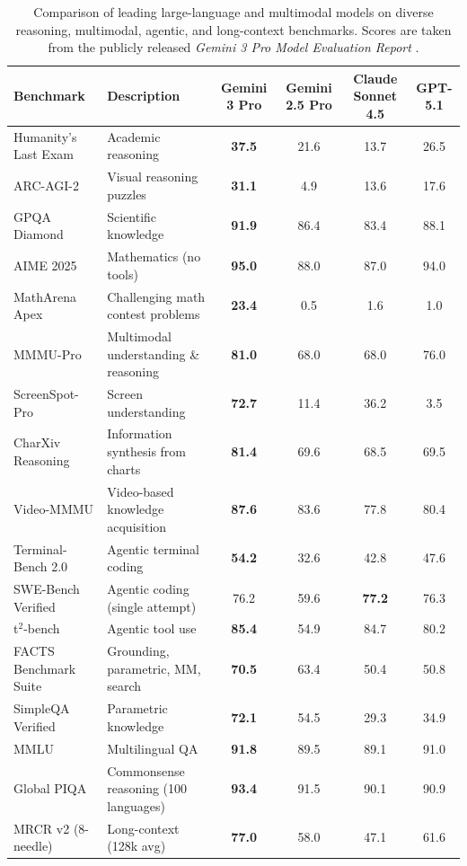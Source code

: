 \documentclass{article}
\begin{document}
\begin{table}[t]
\centering
\scriptsize
\begin{tabularx}{\textwidth}{l X c c c c}
\toprule
\textbf{Benchmark} & \textbf{Description} & \textbf{Gemini 3 Pro} & \textbf{Gemini 2.5 Pro} & \textbf{Claude Sonnet 4.5} & \textbf{GPT-5.1} \\
\midrule
Humanity’s Last Exam & Academic reasoning & \textbf{37.5} & 21.6 & 13.7 & 26.5 \\
ARC-AGI-2 & Visual reasoning puzzles & \textbf{31.1} & 4.9 & 13.6 & 17.6 \\
GPQA Diamond & Scientific knowledge & \textbf{91.9} & 86.4 & 83.4 & 88.1 \\
AIME 2025 & Mathematics (no tools) & \textbf{95.0} & 88.0 & 87.0 & 94.0 \\
MathArena Apex & Challenging math contest problems & \textbf{23.4} & 0.5 & 1.6 & 1.0 \\
MMMU-Pro & Multimodal understanding \& reasoning & \textbf{81.0} & 68.0 & 68.0 & 76.0 \\
ScreenSpot-Pro & Screen understanding & \textbf{72.7} & 11.4 & 36.2 & 3.5 \\
CharXiv Reasoning & Information synthesis from charts & \textbf{81.4} & 69.6 & 68.5 & 69.5 \\
Video-MMMU & Video-based knowledge acquisition & \textbf{87.6} & 83.6 & 77.8 & 80.4 \\
Terminal-Bench 2.0 & Agentic terminal coding & \textbf{54.2} & 32.6 & 42.8 & 47.6 \\
SWE-Bench Verified & Agentic coding (single attempt) & 76.2 & 59.6 & \textbf{77.2} & 76.3 \\
t$^2$-bench & Agentic tool use & \textbf{85.4} & 54.9 & 84.7 & 80.2 \\
FACTS Benchmark Suite & Grounding, parametric, MM, search & \textbf{70.5} & 63.4 & 50.4 & 50.8 \\
SimpleQA Verified & Parametric knowledge & \textbf{72.1} & 54.5 & 29.3 & 34.9 \\
MMLU & Multilingual QA & \textbf{91.8} & 89.5 & 89.1 & 91.0 \\
Global PIQA & Commonsense reasoning (100 languages) & \textbf{93.4} & 91.5 & 90.1 & 90.9 \\
MRCR v2 (8-needle) & Long-context (128k avg) & \textbf{77.0} & 58.0 & 47.1 & 61.6 \\
\bottomrule
\end{tabularx}
\caption{Comparison of leading large-language and multimodal models on diverse reasoning, multimodal, agentic, and long-context benchmarks. Scores are taken from the publicly released \emph{Gemini 3 Pro Model Evaluation Report} \citep{deepmind2025gemini3pro}.}
\label{tab:benchmark_comparison}
\end{table}
\end{document}
